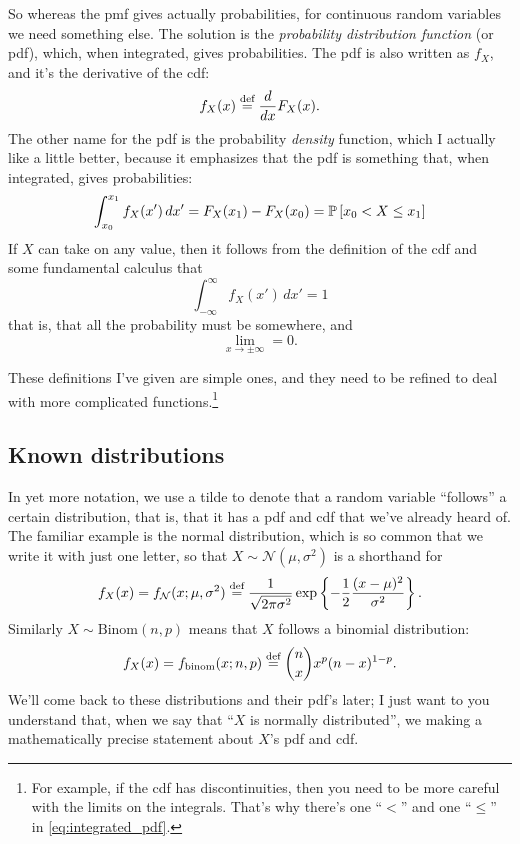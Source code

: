 So whereas the pmf gives actually probabilities, for continuous random
variables we need something else. The solution is the \emph{probability
distribution function} (or pdf), which, when integrated, gives probabilities.
The pdf is also written as $f_X$, and it's the derivative of the cdf:
\begin{equation}
f_X(x) \stackrel{\text{def}}{=} \frac{d}{dx} F_X(x).
\end{equation}
The other name for the pdf is the probability \emph{density} function, which I
actually like a little better, because it emphasizes that the pdf is something
that, when integrated, gives probabilities:
\begin{equation}\label{eq:integrated_pdf}
\int_{x_0}^{x_1} f_X(x') \,dx' = F_X(x_1) - F_X(x_0) = \mathbb{P}\left[{x_0 < X \leq x_1}\right]
\end{equation}
If $X$ can take on any value, then it follows from the definition of the cdf and
some fundamental calculus that
\begin{equation}
\int_{-\infty}^\infty f_X(x') \,dx' = 1
\end{equation}
that is, that all the probability must be somewhere, and
\begin{equation}
\lim_{x \to \pm \infty} = 0.
\end{equation}

These definitions I've given are simple ones, and they need to be refined to
deal with more complicated functions.\footnote{For example, if the cdf has
discontinuities, then you need to be more careful with the limits on the
integrals. That's why there's one ``$<$'' and one ``$\leq$'' in \eqref{eq:integrated_pdf}.}

\subsection{Known distributions}

In yet more notation, we use a tilde to denote that a random variable
``follows'' a certain distribution, that is, that it has a pdf and cdf that
we've already heard of. The familiar example is the normal distribution, which
is so common that we write it with just one letter, so that $X \sim
\mathcal{N}(\mu, \sigma^2)$ is a shorthand for
\begin{equation*}
f_X(x) = f_\mathcal{N}(x; \mu, \sigma^2) \stackrel{\text{def}}{=}
  \frac{1}{\sqrt{2\pi\sigma^2}} \exp \left\{-\frac{1}{2} \frac{(x-\mu)^2}{\sigma^2} \right\}.
\end{equation*}
Similarly $X \sim \mathrm{Binom}(n, p)$ means that $X$ follows a binomial distribution:
\begin{equation*}
f_X(x) = f_\mathrm{binom}(x; n, p) \stackrel{\text{def}}{=} \binom{n}{x} x^p (n-x)^{1-p}.
\end{equation*}
We'll come back to these distributions and their pdf's later; I just want to
you understand that, when we say that ``$X$ is normally distributed'', we
making a mathematically precise statement about $X$'s pdf and cdf.

